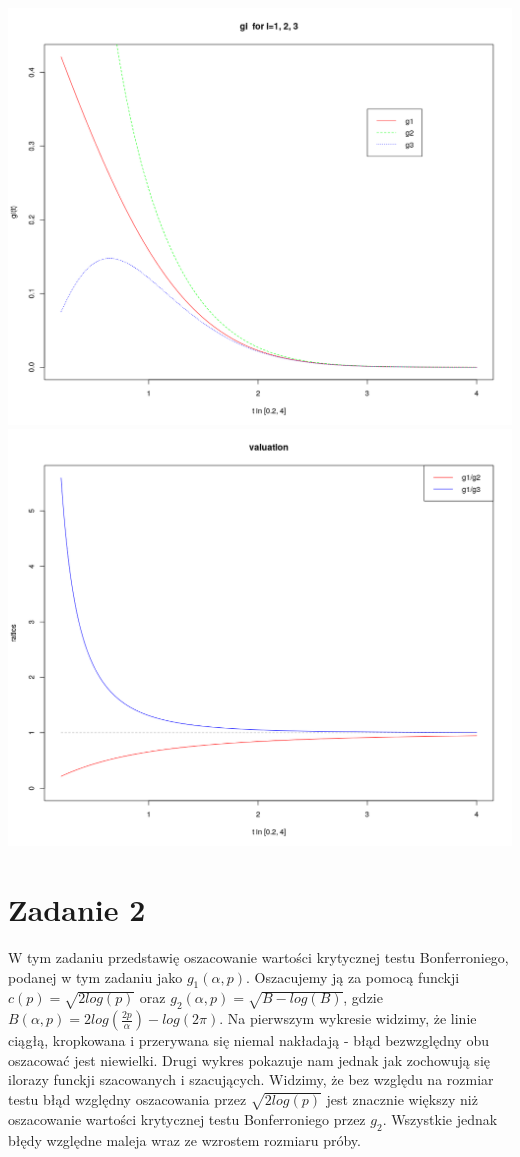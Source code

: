 \documentclass[a4paper,11pt]{article}
\begin{document}
\includegraphics[scale=.3]{plot1.png} 
\includegraphics[scale=.3]{plot2.png} 

\pagebreak

\section{Zadanie 2}

W tym zadaniu przedstawię oszacowanie wartości krytycznej testu Bonferroniego, podanej w tym zadaniu jako $g_{1}(\alpha, p)$. Oszacujemy ją za pomocą funckji $c(p) = \sqrt{2log(p)}$ oraz  $g_{2}(\alpha, p) = \sqrt{B-log(B)}$, gdzie $B(\alpha, p) = 2log(\frac{2p}{\alpha})-log(2\pi)$. Na pierwszym wykresie widzimy, że linie ciągłą, kropkowana i przerywana się niemal nakładają - błąd bezwzględny obu oszacować jest niewielki. Drugi wykres pokazuje nam jednak jak zochowują się ilorazy funckji szacowanych i szacujących. Widzimy, że bez względu na rozmiar testu błąd względny oszacowania przez $\sqrt{2log(p)}$ jest znacznie większy niż oszacowanie wartości krytycznej testu Bonferroniego przez $g_{2}$. Wszystkie jednak błędy względne maleja wraz ze wzrostem rozmiaru próby.
\end{document}
